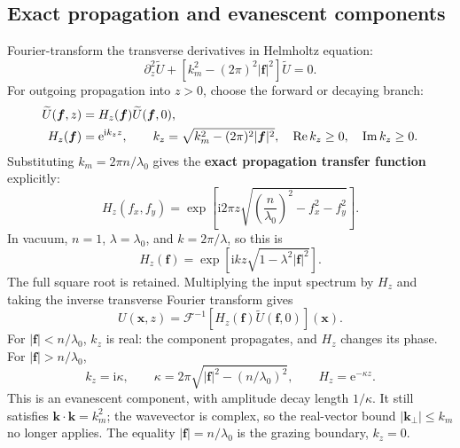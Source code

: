 \documentclass[11pt,a4paper]{article}
\numberwithin{equation}{section}
\newcommand{\ii}{\mathrm{i}}
\newcommand{\ee}{\mathrm{e}}
\newcommand{\vct}[1]{\bm{#1}}
\newcommand{\FT}{\mathcal F}
\newcommand{\Real}{\operatorname{Re}}
\begin{document}
\subsection{Exact propagation and evanescent components}
Fourier-transform the transverse derivatives in Helmholtz equation:
\begin{equation}
\partial_z^2\widetilde U+
\left[k_m^2-(2\pi)^2|\vct f|^2\right]\widetilde U=0.
\end{equation}
For outgoing propagation into $z>0$, choose the forward or decaying branch:
\begin{align}
\widetilde U(\vct f,z)&=H_z(\vct f)\widetilde U(\vct f,0),\notag\\
H_z(\vct f)&=\ee^{\ii k_z z},\qquad
k_z=\sqrt{k_m^2-(2\pi)^2|\vct f|^2},\quad
\Real k_z\geq0,\quad\operatorname{Im}k_z\geq0.
\label{eq:angular}
\end{align}
Substituting $k_m=2\pi n/\lambda_0$ gives the \textbf{exact propagation
transfer function} explicitly:
\begin{equation}
\boxed{H_z(f_x,f_y)=\exp\!\left[
\ii 2\pi z\sqrt{\left(\frac{n}{\lambda_0}\right)^2-f_x^2-f_y^2}
\right].}
\label{eq:exact-propagator}
\end{equation}
In vacuum, $n=1$, $\lambda=\lambda_0$, and $k=2\pi/\lambda$, so this is
\[
H_z(\vct f)=\exp\!\left[\ii kz\sqrt{1-\lambda^2|\vct f|^2}\right].
\]
The full square root is retained. Multiplying the input spectrum by
$H_z$ and taking the inverse transverse Fourier transform gives
\begin{equation}
U(\vct x,z)=\FT^{-1}\!\left[
H_z(\vct f)\widetilde U(\vct f,0)\right](\vct x).
\label{eq:exact-field-propagation}
\end{equation}
For $|\vct f|<n/\lambda_0$, $k_z$ is real: the component propagates,
and $H_z$ changes its phase. For $|\vct f|>n/\lambda_0$,
\begin{equation}
k_z=\ii\kappa,\qquad
\kappa=2\pi\sqrt{|\vct f|^2-(n/\lambda_0)^2},\qquad
H_z=\ee^{-\kappa z}.
\end{equation}
This is an evanescent component, with amplitude decay length $1/\kappa$.
It still satisfies $\vct k\cdot\vct k=k_m^2$; the wavevector is complex,
so the real-vector bound $|\vct k_\perp|\leq k_m$ no longer applies.
The equality $|\vct f|=n/\lambda_0$ is the grazing boundary, $k_z=0$.
\end{document}
